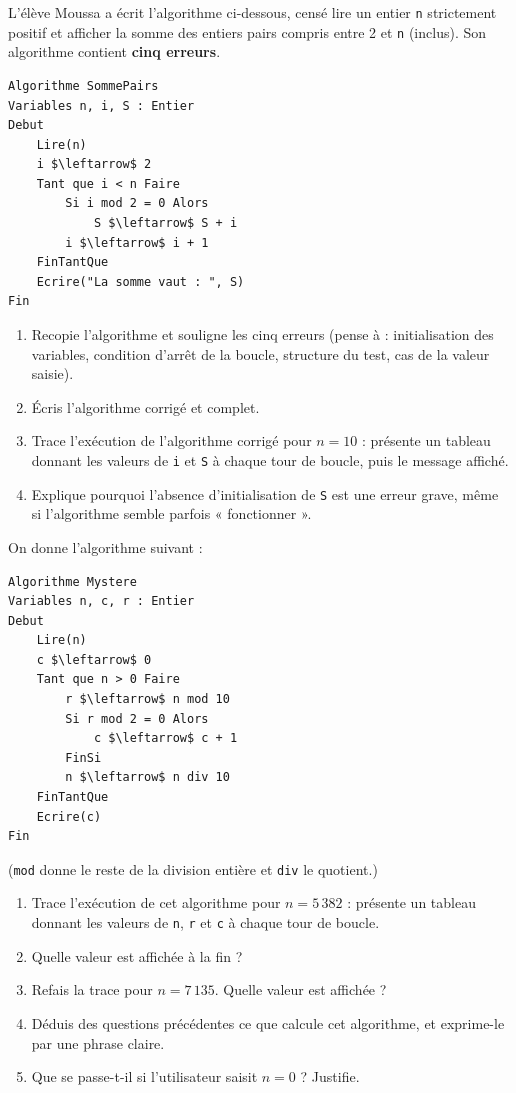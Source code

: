 \documentclass[11pt]{article}
\begin{document}
\begin{exercice}
L'élève Moussa a écrit l'algorithme ci-dessous, censé lire un entier \texttt{n} strictement positif et afficher la somme des entiers pairs compris entre 2 et \texttt{n} (inclus). Son algorithme contient \textbf{cinq erreurs}.
\begin{lstlisting}
Algorithme SommePairs
Variables n, i, S : Entier
Debut
    Lire(n)
    i $\leftarrow$ 2
    Tant que i < n Faire
        Si i mod 2 = 0 Alors
            S $\leftarrow$ S + i
        i $\leftarrow$ i + 1
    FinTantQue
    Ecrire("La somme vaut : ", S)
Fin
\end{lstlisting}
\begin{enumerate}
  \item Recopie l'algorithme et souligne les cinq erreurs (pense à : initialisation des variables, condition d'arrêt de la boucle, structure du test, cas de la valeur saisie).
  \item Écris l'algorithme corrigé et complet.
  \item Trace l'exécution de l'algorithme corrigé pour $n = 10$ : présente un tableau donnant les valeurs de \texttt{i} et \texttt{S} à chaque tour de boucle, puis le message affiché.
  \item Explique pourquoi l'absence d'initialisation de \texttt{S} est une erreur grave, même si l'algorithme semble parfois « fonctionner ».
\end{enumerate}
\end{exercice}

\begin{exercice}
On donne l'algorithme suivant :
\begin{lstlisting}
Algorithme Mystere
Variables n, c, r : Entier
Debut
    Lire(n)
    c $\leftarrow$ 0
    Tant que n > 0 Faire
        r $\leftarrow$ n mod 10
        Si r mod 2 = 0 Alors
            c $\leftarrow$ c + 1
        FinSi
        n $\leftarrow$ n div 10
    FinTantQue
    Ecrire(c)
Fin
\end{lstlisting}
(\texttt{mod} donne le reste de la division entière et \texttt{div} le quotient.)
\begin{enumerate}
  \item Trace l'exécution de cet algorithme pour $n = 5\,382$ : présente un tableau donnant les valeurs de \texttt{n}, \texttt{r} et \texttt{c} à chaque tour de boucle.
  \item Quelle valeur est affichée à la fin ?
  \item Refais la trace pour $n = 7\,135$. Quelle valeur est affichée ?
  \item Déduis des questions précédentes ce que calcule cet algorithme, et exprime-le par une phrase claire.
  \item Que se passe-t-il si l'utilisateur saisit $n = 0$ ? Justifie.
\end{enumerate}
\end{exercice}
\end{document}
